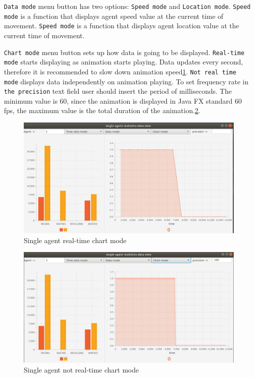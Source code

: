 \documentclass[thesis=B,english]{FITthesis}[2019/12/23]
\begin{document}
\verb|Data mode| menu button has two options: \verb|Speed mode| and \verb|Location mode|. \verb|Speed mode| is a function that displays agent speed value at the current time of movement. \verb|Speed mode| is a function that displays agent location value at the current time of movement.

\verb|Chart mode| menu button sets up how data is going to be displayed. \verb|Real-time mode| starts displaying as animation starts playing. Data updates every second, therefore it is recommended to slow down animation speed\ref{fig:float21}. \verb|Not real time mode| displays data independently on animation playing. To set frequency rate in \verb|the precision| text field user should insert the period of milliseconds. The minimum value is 60, since the animation is displayed in Java FX standard 60 fps,  the maximum value is the total duration of the animation.\ref{fig:float22}.  

\begin{figure}
	\includegraphics[scale=0.34]{onlinechart.png}
	\caption[Online chart mode]{Single agent real-time chart mode}\label{fig:float21}
\end{figure}

\begin{figure}
	\includegraphics[scale=0.34]{not-onlinechart.png}
	\caption[Not Online chart mode]{Single agent not real-time chart mode}\label{fig:float22}
\end{figure}
\end{document}
